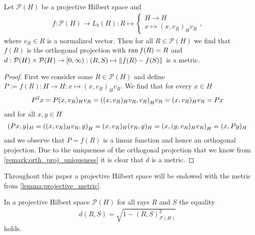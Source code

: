 \begin{lemma} \label{lemma:projective_metric}
	Let $\mathcal{P}(H)$ be a projective Hilbert space and
	\begin{align*}
		f: \mathcal{P}(H) \to L_b(H): R \mapsto 
		\begin{cases}
			H \to H \\
			x \mapsto (x,v_R)_H v_R
		\end{cases},
	\end{align*} 
	where $v_R \in R$ is a normalized vector. Then for all $R \in \mathcal{P}(H)$ we find that $f(R)$ is the orthogonal projection with $\operatorname{ran} f(R) = R$ and $d: \mathcal{P}(H) \times \mathcal{P}(H) \to [0, \infty): (R,S) \mapsto {\left \| f(R) - f(S) \right \|}_{}$ is a metric. 
\end{lemma}

\begin{proof}
	First we consider some $R \in \mathcal{P}(H)$ and define $P := f(R): H \to H: x \mapsto (x,v_R)_H v_R$. We find that for every $x \in H$
	\begin{align*}
		P^2x = P(x, v_R)_H v_R = {\left ( (x, v_R)_H v_R, v_R \right )}_H v_R = (x,v_R)_H v_R = Px
	\end{align*}
	and for all $x,y \in H$
	\begin{align*}
		(Px, y)_H = {\left ( (x, v_R)_H v_R, y \right )}_H = (x, v_R)_H (v_R, y)_H = {\left ( x, (y, v_R)_H v_R \right )}_H = (x, Py)_H
	\end{align*}
	and we observe that $P = f(R)$ is a linear function and hence an orthogonal projection. Due to the uniqueness of the orthogonal projection that we know from \ref{remark:orth_proj_uniqueness} it is clear that $d$ is a metric.
\end{proof}


\begin{remark}
	Throughout this paper a projective Hilbert space will be endowed with the metric from \ref{lemma:projective_metric}. 
\end{remark}


\begin{lemma} \label{lemma:metric_representation}
	In a projective Hilbert space $\mathcal{P}(H)$ for all rays $R$ and $S$ the equality 
	\begin{align*}
		d(R,S) = \sqrt{1 - (R,S)_{\mathcal{P}(H)}^2}
	\end{align*}
	holds.
\end{lemma}

